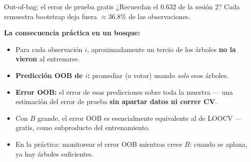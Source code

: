 \documentclass{beamer}
\newcommand{\1}{\mathbb{I}}
\begin{document}
\begin{frame}{Out-of-bag: el error de prueba gratis}
\small
¿Recuerdan el $0.632$ de la sesión 2? Cada remuestra bootstrap deja fuera $\approx 36.8\%$ de las observaciones.
\pause

\vspace{0.2cm}
\textbf{La consecuencia práctica en un bosque:}
\begin{itemize}\itemsep5pt
  \item Para cada observación $i$, aproximadamente un tercio de los árboles \textbf{no la vieron} al entrenarse.
  \item \textbf{Predicción OOB de $i$:} promediar (o votar) usando \emph{solo} esos árboles.
  \item \textbf{Error OOB:} el error de esas predicciones sobre toda la muestra --- una estimación del error de prueba \textbf{sin apartar datos ni correr CV}. \pause
\end{itemize}

\vspace{0.1cm}
\begin{itemize}\itemsep4pt
  \item Con $B$ grande, el error OOB es esencialmente equivalente al de LOOCV --- gratis, como subproducto del entrenamiento.
  \item En la práctica: monitorear el error OOB mientras crece $B$; cuando se aplana, ya hay árboles suficientes.
\end{itemize}
\end{frame}
\end{document}
